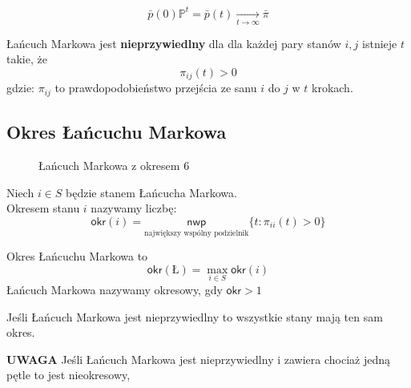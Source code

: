 $$\bar{p}(0)\mathbb{P}^t=\bar{p}(t)\underset{t\rightarrow \infty}{\rightarrow}\bar{\pi}$$

\begin{definition}\label{def:NieprzywiedlnoscLM}
Łańcuch Markowa jest \textbf{nieprzywiedlny} dla dla każdej pary stanów $i,j$ istnieje $t$ takie, że 
$$\pi _{ij}(t)>0$$ gdzie: $\pi _{ij}$ to prawdopodobieństwo przejścia ze sanu $i$ do $j$ w $t$ krokach.
\end{definition}

\subsection{Okres Łańcuchu Markowa}
\begin{figure}[H]
\centering
{}
\caption*{Łańcuch Markowa z okresem 6}
\end{figure}

\begin{definition}\label{def:OkresStanuLM}
Niech $i\in S$ będzie stanem Łańcucha Markowa.\\
Okresem stanu $i$ nazywamy liczbę:
$$\mathsf{okr}(i)=\underset{\text{największy wspólny podzielnik}}{\mathsf{nwp}}\{t: \pi _{ii}(t)>0\}$$
\end{definition}
\begin{definition}\label{def:OkresLM}
Okres Łańcuchu Markowa to
$$\mathsf{okr}(Ł)=\max _{i\in S} \mathsf{okr}(i)$$
Łańcuch Markowa nazywamy okresowy, gdy $\mathsf{okr}>1$
\end{definition}
\begin{fact*}\label{fac:OkresLM}
Jeśli Łańcuch Markowa jest nieprzywiedlny to wszystkie stany mają ten sam okres.
\end{fact*}
\textbf{UWAGA} Jeśli Łańcuch Markowa jest nieprzywiedlny i zawiera chociaż jedną pętle to jest nieokresowy,

